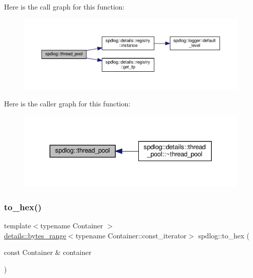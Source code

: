 Here is the call graph for this function\+:
\nopagebreak
\begin{figure}[H]
\begin{center}
\leavevmode
\includegraphics[width=350pt]{namespacespdlog_a6676a1ffb5ea174a2392ab0317bbcff2_cgraph}
\end{center}
\end{figure}
Here is the caller graph for this function\+:
\nopagebreak
\begin{figure}[H]
\begin{center}
\leavevmode
\includegraphics[width=330pt]{namespacespdlog_a6676a1ffb5ea174a2392ab0317bbcff2_icgraph}
\end{center}
\end{figure}
\mbox{\label{namespacespdlog_acd3f4323bb627945b4cecbbbc62770ef}} 
\subsubsection{\texorpdfstring{to\+\_\+hex()}{to\_hex()}\hspace{0.1cm}{\footnotesize\ttfamily [1/2]}}
{\footnotesize\ttfamily template$<$typename Container $>$ \\
\hyperlink{classspdlog_1_1details_1_1bytes__range}{details\+::bytes\+\_\+range}$<$typename Container\+::const\+\_\+iterator$>$ spdlog\+::to\+\_\+hex (\begin{DoxyParamCaption}\item[{const Container \&}]{container }\end{DoxyParamCaption})\hspace{0.3cm}{\ttfamily [inline]}}



